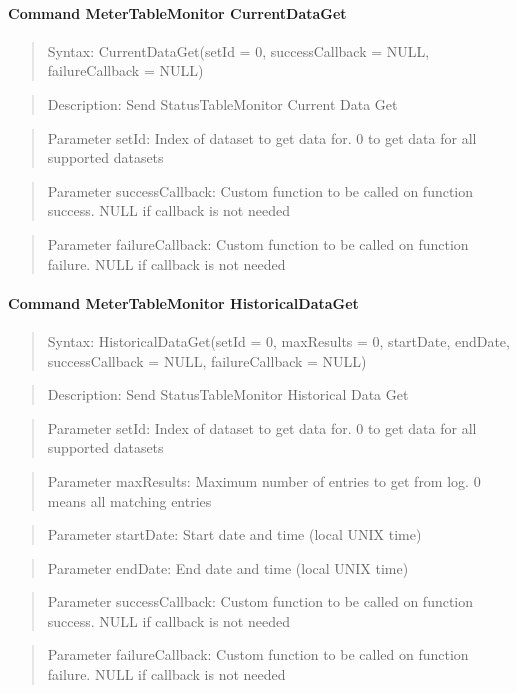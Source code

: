 \paragraph{Command MeterTableMonitor CurrentDataGet}
\begin{quote}Syntax: CurrentDataGet(setId = 0, successCallback = NULL, failureCallback = NULL)\end{quote}
\begin{quote}Description: Send StatusTableMonitor Current Data Get\end{quote}
\begin{quote}Parameter setId: Index of dataset to get data for. 0 to get data for all supported datasets\end{quote}
\begin{quote}Parameter successCallback: Custom function to be called on function success. NULL if callback is not needed\end{quote}
\begin{quote}Parameter failureCallback: Custom function to be called on function failure. NULL if callback is not needed\end{quote}


\paragraph{Command MeterTableMonitor HistoricalDataGet}
\begin{quote}Syntax: HistoricalDataGet(setId = 0, maxResults = 0, startDate, endDate, successCallback = NULL, failureCallback = NULL)\end{quote}
\begin{quote}Description: Send StatusTableMonitor Historical Data Get\end{quote}
\begin{quote}Parameter setId: Index of dataset to get data for. 0 to get data for all supported datasets\end{quote}
\begin{quote}Parameter maxResults: Maximum number of entries to get from log. 0 means all matching entries\end{quote}
\begin{quote}Parameter startDate: Start date and time (local UNIX time)\end{quote}
\begin{quote}Parameter endDate: End date and time (local UNIX time)\end{quote}
\begin{quote}Parameter successCallback: Custom function to be called on function success. NULL if callback is not needed\end{quote}
\begin{quote}Parameter failureCallback: Custom function to be called on function failure. NULL if callback is not needed\end{quote}



